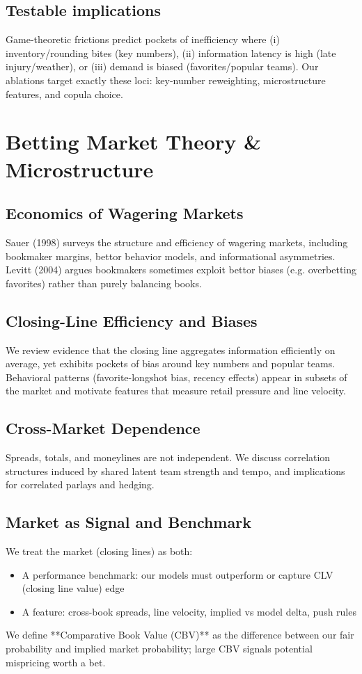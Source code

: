 \subsection{Testable implications}
Game‑theoretic frictions predict pockets of inefficiency where (i) inventory/rounding bites (key numbers), (ii) information latency is high (late injury/weather), or (iii) demand is biased (favorites/popular teams). Our ablations target exactly these loci: key‑number reweighting, microstructure features, and copula choice.
\endgroup

\section{Betting Market Theory \& Microstructure}
\label{sec:market}

\subsection{Economics of Wagering Markets}
Sauer (1998) surveys the structure and efficiency of wagering markets, including bookmaker margins, bettor behavior models, and informational asymmetries. \citep{sauer1998}  
Levitt (2004) argues bookmakers sometimes exploit bettor biases (e.g. overbetting favorites) rather than purely balancing books. \citep{levitt2004}

\subsection{Closing-Line Efficiency and Biases}
We review evidence that the closing line aggregates information efficiently on average, yet exhibits pockets of bias around key numbers and popular teams. Behavioral patterns (favorite-longshot bias, recency effects) appear in subsets of the market and motivate features that measure retail pressure and line velocity.

\subsection{Cross-Market Dependence}
Spreads, totals, and moneylines are not independent. We discuss correlation structures induced by shared latent team strength and tempo, and implications for correlated parlays and hedging.

\subsection{Market as Signal and Benchmark}
We treat the market (closing lines) as both:
\begin{itemize}
  \item A performance benchmark: our models must outperform or capture CLV (closing line value) edge
  \item A feature: cross-book spreads, line velocity, implied vs model delta, push rules
\end{itemize}
We define **Comparative Book Value (CBV)** as the difference between our fair probability and implied market probability; large CBV signals potential mispricing worth a bet.

